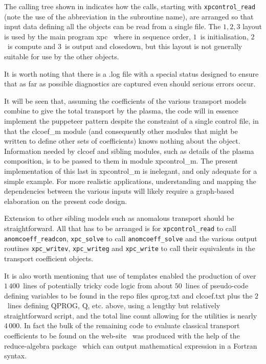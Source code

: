 The calling tree shown in  indicates how the calls, starting with {\tt xpcontrol\_read}
(note the use of the abbreviation in the subroutine name), are arranged so that input data
defining all the objects can be read from a single file.
The $1, 2, 3$ layout is used by the main program xpc~\cite{y2re312}
where in sequence order, $1$~is initialisation, $2$~is compute and $3$~is output and closedown,
but this layout is not generally suitable for use by the other objects.

It is worth noting that there is a .log file
with a special status designed to ensure that as far as possible diagnostics are captured
even should serious errors occur.

It will be seen that, assuming the coefficients of the various transport models combine to
give the total transport by the plasma,  the code will in essence implement the puppeteer
pattern despite the constraint
of a single control file, in that the clcoef\_m  module (and consequently other modules
that might be written to define other sets of coefficients) knows nothing about the  object.
Information needed by clcoef and sibling modules, such as details of the plasma composition, is to be passed
to them in module xpcontrol\_m. The present implementation of this last in xpcontrol\_m
is inelegant, and only adequate for a simple example. For more realistic applications,
understanding and mapping the dependencies between the various inputs will likely
require a graph-based elaboration on the present code design.

Extension to other sibling models such as anomalous transport should be straightforward.
All that has to be arranged is for {\tt xpcontrol\_read} to call {\tt anomcoeff\_readcon},
{\tt xpc\_solve} to call {\tt anomcoeff\_solve} and the various output routines {\tt xpc\_writev},
{\tt xpc\_writeg} and  {\tt xpc\_write} to call their equivalents in the transport coefficient objects.

It is also worth mentioning that use of templates enabled the production of over $1\,400$~lines
of potentially tricky code logic from about $50$~lines of pseudo-code defining variables to be found
in the repo files qprog.txt and clcoef.txt plus
the $2$~lines defining QPROG, Q, etc. above, using a
lengthy but relatively straightforward script, and the total line count allowing
for the utilities is nearly~$4\,000$. In fact the bulk of the remaining code to evaluate classical
transport coefficients to be found on the web-site~\cite{miscwebsite}  was produced with
the help of the reduce-algebra
package~\cite{reducewebsite} which can output mathematical expression in a Fortran syntax.

